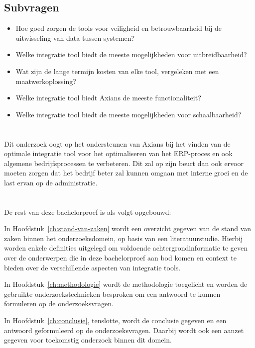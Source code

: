 \subsection{Subvragen}
\label{sec:SubvragenBP}
\begin{itemize}
  \item Hoe goed zorgen de tools voor veiligheid en betrouwbaarheid bij de uitwisseling van data tussen systemen?
  \item Welke integratie tool biedt de meeste mogelijkheden voor uitbreidbaarheid?
  \item Wat zijn de lange termijn kosten van elke tool, vergeleken met een maatwerkoplossing?
  \item Welke integratie tool biedt Axians de meeste functionaliteit?
  \item Welke integratie tool biedt de meeste mogelijkheden voor schaalbaarheid?
\end{itemize}

\section{}%
\label{sec:onderzoeksdoelstelling}

Dit onderzoek oogt op het ondersteunen van Axians bij het vinden van de optimale integratie tool voor het optimaliseren van het ERP-proces en ook algemene bedrijfsprocessen te verbeteren. Dit zal op zijn beurt dan ook ervoor moeten zorgen dat het bedrijf beter zal kunnen omgaan met interne groei en de last ervan op de administratie.

\section{}%
\label{sec:opzet-bachelorproef}


De rest van deze bachelorproef is als volgt opgebouwd:

In Hoofdstuk~\ref{ch:stand-van-zaken} wordt een overzicht gegeven van de stand van zaken binnen het onderzoeksdomein, op basis van een literatuurstudie. Hierbij worden enkele definities uitgelegd om voldoende achtergrondinformatie te geven over de onderwerpen die in deze bachelorproef aan bod komen en context te bieden over de verschillende aspecten van integratie tools.

In Hoofdstuk~\ref{ch:methodologie} wordt de methodologie toegelicht en worden de gebruikte onderzoekstechnieken besproken om een antwoord te kunnen formuleren op de onderzoeksvragen.


In Hoofdstuk~\ref{ch:conclusie}, tenslotte, wordt de conclusie gegeven en een antwoord geformuleerd op de onderzoeksvragen. Daarbij wordt ook een aanzet gegeven voor toekomstig onderzoek binnen dit domein.